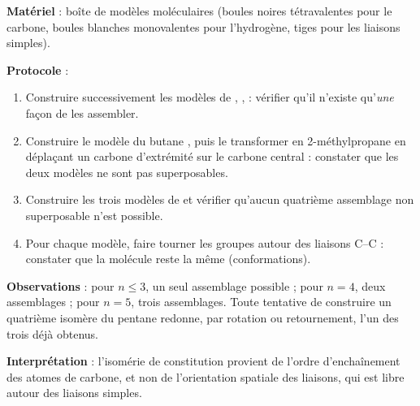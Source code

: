 \documentclass[11pt]{article}
\begin{document}
\begin{experience}
\textbf{Matériel} : boîte de modèles moléculaires (boules noires tétravalentes pour le carbone, boules blanches monovalentes pour l'hydrogène, tiges pour les liaisons simples).

\textbf{Protocole} :
\begin{enumerate}
\item Construire successivement les modèles de , ,  : vérifier qu'il n'existe qu'\emph{une} façon de les assembler.
\item Construire le modèle du butane , puis le transformer en 2-méthylpropane en déplaçant un carbone d'extrémité sur le carbone central : constater que les deux modèles ne sont pas superposables.
\item Construire les trois modèles de  et vérifier qu'aucun quatrième assemblage non superposable n'est possible.
\item Pour chaque modèle, faire tourner les groupes  autour des liaisons C--C : constater que la molécule reste la même (conformations).
\end{enumerate}

\textbf{Observations} : pour $n \leq 3$, un seul assemblage possible ; pour $n = 4$, deux assemblages ; pour $n = 5$, trois assemblages. Toute tentative de construire un quatrième isomère du pentane redonne, par rotation ou retournement, l'un des trois déjà obtenus.

\textbf{Interprétation} : l'isomérie de constitution provient de l'ordre d'enchaînement des atomes de carbone, et non de l'orientation spatiale des liaisons, qui est libre autour des liaisons simples.
\end{experience}
\end{document}
